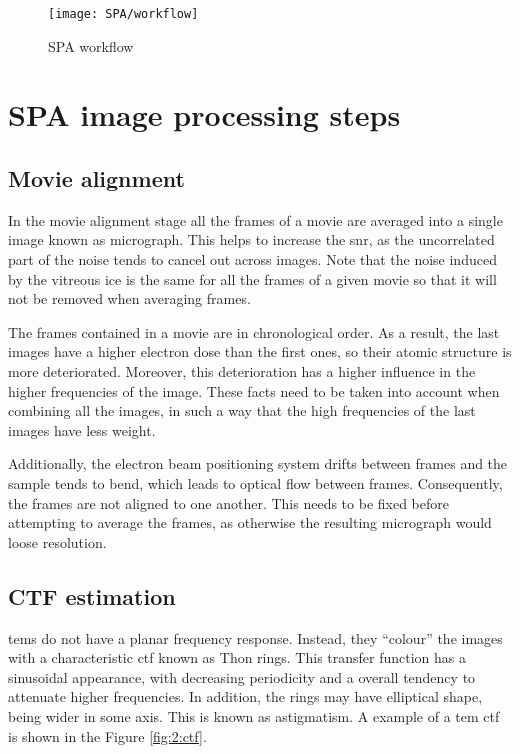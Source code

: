 \documentclass[../main.tex]{subfiles}
\begin{document}
\begin{landscape}
    \begin{figure}
        \centering
        \texttt{[image: SPA/workflow]}
        \caption{SPA workflow}
        \label{fig:2:spa_workflow}
    \end{figure}
\end{landscape}

\section{SPA image processing steps}

\subsection{Movie alignment}
In the movie alignment stage all the frames of a movie are averaged into a single image known as micrograph. This helps to increase the \gls{snr}, as the uncorrelated part of the noise tends to cancel out across images. Note that the noise induced by the vitreous ice is the same for all the frames of a given movie so that it will not be removed when averaging frames. 

The frames contained in a movie are in chronological order. As a result, the last images have a higher electron dose than the first ones, so their atomic structure is more deteriorated. Moreover, this deterioration has a higher influence in the higher frequencies of the image. These facts need to be taken into account when combining all the images, in such a way that the high frequencies of the last images have less weight\cite{cryoem101}. 

Additionally, the electron beam positioning system drifts between frames and the sample tends to bend, which leads to optical flow between frames. Consequently, the frames are not aligned to one another. This needs to be fixed before attempting to average the frames, as otherwise the resulting micrograph would loose resolution.

\subsection{CTF estimation}
\Glspl{tem} do not have a planar frequency response. Instead, they ``colour'' the images with a characteristic \gls{ctf} known as Thon rings. This transfer function has a sinusoidal appearance, with decreasing periodicity and a overall tendency to attenuate higher frequencies\cite{cryoem101}.  In addition, the rings may have elliptical shape, being wider in some axis. This is known as astigmatism. A example of a \gls{tem} \gls{ctf} is shown in the Figure \ref{fig:2:ctf}.
\end{document}
